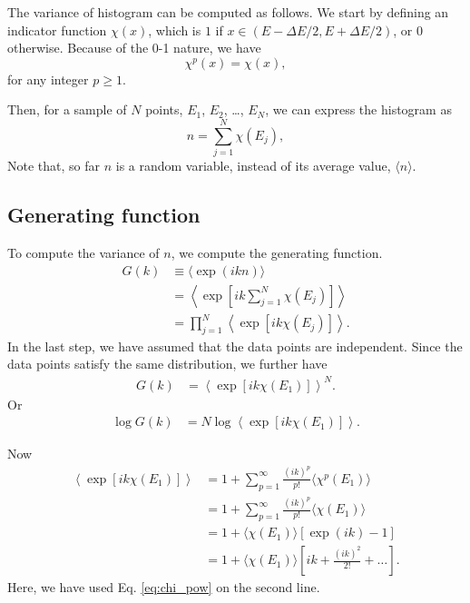 \documentclass[aip,jcp,preprint,superscriptaddress]{revtex4-1}
\begin{document}
The variance of histogram
can be computed as follows.
%
We start by defining an indicator function $\chi(x)$,
which is $1$ if $x \in (E - \Delta E/2, E + \Delta E/2)$,
or $0$ otherwise.
%
Because of the 0-1 nature, we have
%
\begin{equation}
  \chi^p(x) = \chi(x),
  \label{eq:chi_pow}
\end{equation}
for any integer $p \ge 1$.


%
Then, for a sample of $N$ points,
$E_1$, $E_2$, \dots, $E_N$,
we can express the histogram as
%
\[
  n = \sum_{j = 1}^N \chi( E_j ),
\]
%
Note that,
so far $n$ is a random variable,
instead of its average value, $\langle n \rangle$.



\subsection{Generating function}



To compute the variance of $n$,
we compute the generating function\cite{vankampen}.
\begin{align*}
G(k)
&\equiv
\langle
  \exp( i k n )
\rangle
\\
&=
\left\langle
\exp\left[ i k \sum_{j = 1}^N \chi( E_j) \right]
\right\rangle
\\
&=
\prod_{j = 1}^N
\left\langle
\exp[ i k \chi( E_j) ]
\right\rangle.
\end{align*}
%
In the last step,
we have assumed that the data points are independent.
%
Since the data points
satisfy the same distribution,
we further have
\begin{align*}
G(k)
&=
  \left\langle
    \exp[ i k \chi( E_1) ]
  \right\rangle^N.
\end{align*}
%
Or
\begin{align*}
\log G(k)
&=
N \log
  \left\langle
    \exp[ i k \chi( E_1) ]
  \right\rangle
.
\end{align*}


Now
\begin{align*}
  \left\langle
    \exp[ i k \chi( E_1) ]
  \right\rangle
&=
  1 +
  \sum_{p = 1}^\infty
    \frac{ (i k)^p }{ p! }
    \langle
    \chi^p( E_1 )
    \rangle
\\
&=
  1  +
  \sum_{p = 1}^\infty
    \frac{ (i k)^p }{ p! }
    \langle
    \chi( E_1 )
    \rangle
\\
&=
  1
  +
  \langle
  \chi( E_1 )
  \rangle
  [\exp( i k ) - 1]
\\
&=
  1
  +
  \langle
  \chi( E_1 )
  \rangle
  \left[
  i k
  +
  \frac{ (i k)^2 } { 2! }
  + \dots
  \right].
\end{align*}
%
Here,
we have used Eq. \eqref{eq:chi_pow} on the second line.
\end{document}
